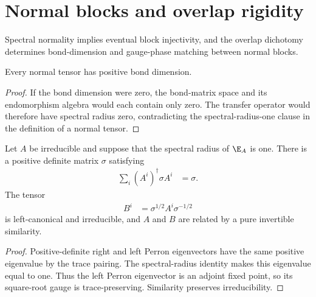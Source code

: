 \section{Normal blocks and overlap rigidity}

Spectral normality implies eventual block injectivity, and the overlap
dichotomy determines bond-dimension and gauge-phase matching between normal
blocks.

\begin{lemma}
    \label{thm:cpsv_normal_bond_dim_pos}
    \leanok
    Every normal tensor has positive bond dimension.
\end{lemma}

\begin{proof}
    \leanok
    If the bond dimension were zero, the bond-matrix space and its endomorphism
    algebra would each contain only zero. The transfer operator would therefore
    have spectral radius zero, contradicting the spectral-radius-one clause in
    the definition of a normal tensor.
\end{proof}

\begin{lemma}
    \label{thm:pure_perron_tp_gauge}
    \leanok
    Let $A$ be irreducible and suppose that the spectral radius of $\E_A$ is
    one.  There is a positive definite matrix $\sigma$ satisfying
    \begin{align}
        \sum_i(A^i)^\dagger\sigma A^i & =\sigma.
    \end{align}
    The tensor
    \begin{align}
        B^i & =\sigma^{1/2}A^i\sigma^{-1/2}
    \end{align}
    is left-canonical and irreducible, and $A$ and $B$ are related by a pure
    invertible similarity.
\end{lemma}
\begin{proof}
    \leanok
    Positive-definite right and left Perron eigenvectors have the same positive
    eigenvalue by the trace pairing.  The spectral-radius identity makes this
    eigenvalue equal to one.  Thus the left Perron eigenvector is an adjoint
    fixed point, so its square-root gauge is trace-preserving.  Similarity
    preserves irreducibility.
\end{proof}

